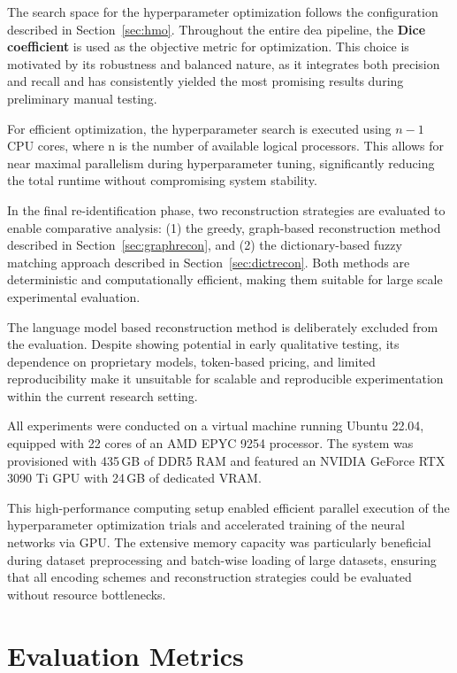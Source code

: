 The search space for the hyperparameter optimization follows the configuration described in Section~\ref{sec:hmo}.
Throughout the entire \ac{dea} pipeline, the \textbf{Dice coefficient} is used as the objective metric for optimization.
This choice is motivated by its robustness and balanced nature, as it integrates both precision and recall and has consistently yielded the most promising results during preliminary manual testing.

For efficient optimization, the hyperparameter search is executed using $n - 1$ CPU cores, where n is the number of available logical processors.
This allows for near maximal parallelism during hyperparameter tuning, significantly reducing the total runtime without compromising system stability.

In the final re-identification phase, two reconstruction strategies are evaluated to enable comparative analysis: (1) the greedy, graph-based reconstruction method described in Section~\ref{sec:graphrecon}, and (2) the dictionary-based fuzzy matching approach described in Section~\ref{sec:dictrecon}.
Both methods are deterministic and computationally efficient, making them suitable for large scale experimental evaluation.

The language model based reconstruction method is deliberately excluded from the evaluation.
Despite showing potential in early qualitative testing, its dependence on proprietary models, token-based pricing, and limited reproducibility make it unsuitable for scalable and reproducible experimentation within the current research setting.

All experiments were conducted on a virtual machine running Ubuntu 22.04, equipped with 22 cores of an AMD EPYC 9254 processor.
The system was provisioned with 435\,GB of DDR5 RAM and featured an NVIDIA GeForce RTX 3090 Ti GPU with 24\,GB of dedicated VRAM.

This high-performance computing setup enabled efficient parallel execution of the hyperparameter optimization trials and accelerated training of the neural networks via GPU.
The extensive memory capacity was particularly beneficial during dataset preprocessing and batch-wise loading of large datasets, ensuring that all encoding schemes and reconstruction strategies could be evaluated without resource bottlenecks.

\section{Evaluation Metrics}  \label{sec:metrics}


